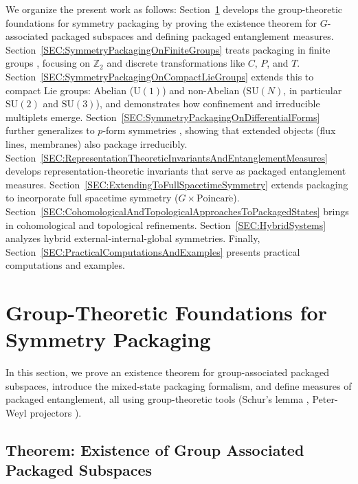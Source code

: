 \documentclass[12pt,a4paper]{article}
\begin{document}
We organize the present work as follows:
Section~\ref{SEC:GroupTheoreticFoundationsForSymmetryPackaging} develops the group-theoretic foundations for symmetry packaging by proving the existence theorem for $G$-associated packaged subspaces and defining packaged entanglement measures.
Section~\ref{SEC:SymmetryPackagingOnFiniteGroups} treats packaging in finite groups \cite{Artin2014,Georgi2000}, focusing on $\mathbb{Z}_2$ and discrete transformations like $C$, $P$, and $T$.
Section~\ref{SEC:SymmetryPackagingOnCompactLieGroups} extends this to compact Lie groups:
Abelian ($\mathrm{U}(1)$) and non-Abelian \cite{Yang1954} ($\mathrm{SU}(N)$, in particular $\mathrm{SU}(2)$ and $\mathrm{SU}(3)$), and demonstrates how confinement and irreducible multiplets emerge. 
Section~\ref{SEC:SymmetryPackagingOnDifferentialForms} further generalizes to $p$-form symmetries \cite{KapustinSeiberg2014,Gaiotto2015}, showing that extended objects (flux lines, membranes) \cite{Polchinski1995,Witten1995,Kitaev2006,Tachikawa2020,BanksSeiberg2011} also package irreducibly.
Section~\ref{SEC:RepresentationTheoreticInvariantsAndEntanglementMeasures} develops representation-theoretic invariants that serve as packaged entanglement measures.  
Section~\ref{SEC:ExtendingToFullSpacetimeSymmetry} extends packaging to incorporate full spacetime symmetry ($G \times \mathrm{Poincar\acute e}$). 
Section~\ref{SEC:CohomologicalAndTopologicalApproachesToPackagedStates} brings in cohomological and topological refinements.
Section~\ref{SEC:HybridSystems} analyzes hybrid external-internal-global symmetries.
Finally,
Section~\ref{SEC:PracticalComputationsAndExamples} presents practical computations and examples.





\section{Group-Theoretic Foundations for Symmetry Packaging}
\label{SEC:GroupTheoreticFoundationsForSymmetryPackaging}


In this section, we prove an existence theorem for group-associated packaged subspaces, introduce the mixed-state packaging formalism, and define measures of packaged entanglement, all using group-theoretic tools (Schur’s lemma \cite{Serre1977,FultonHarris1991}, Peter-Weyl projectors \cite{PeterWeyl1927,Knapp1986}).



\subsection{Theorem: Existence of Group Associated Packaged Subspaces}
\label{SEC:ExistenceOfGroupAssociatedPackagedSubSpaces}
\end{document}
